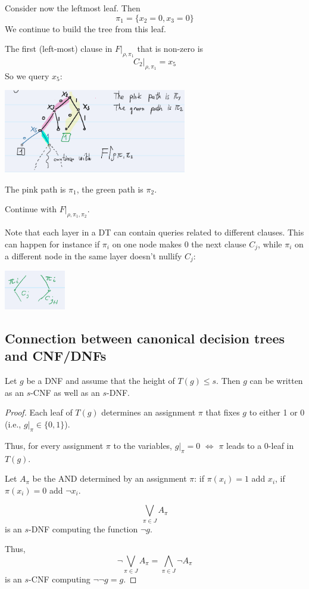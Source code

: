 Consider now the leftmost leaf. Then
\[
\pi_1 = \{ x_2 = 0, x_3 = 0 \}
\]
We continue to build the tree from this leaf.

\noindent
The first (left-most) clause in \( F|_{\rho, \pi_1} \) that is non-zero is
\[
C_2|_{\rho, \pi_1} = x_5
\]
So we query \( x_5 \):

\noindent
\includegraphics[width=0.6\textwidth]{images/ex4-sl-dt.png}
\noindent

The pink path is \( \pi_1 \), the green path is \( \pi_2 \).

\noindent
Continue with \( F|_{\rho, \pi_1, \pi_2} \).

\noindent
Note that each layer in a DT can contain queries related to different clauses.
This can happen for instance if \( \pi_i \) on one node makes 0 the next clause \( C_j \), 
while \( \pi_i \) on a different node in the same layer doesn't nullify \( C_j \):
 
\includegraphics[width=0.2\textwidth]{images/ex5-sl-dt.png}
 

\subsection{Connection between canonical decision trees and CNF/DNFs}
\begin{claim}
Let \( g \) be a DNF and assume that the height of \( T(g) \leq s \).
Then \( g \) can be written as an \( s \)-CNF as well as an \( s \)-DNF.
\end{claim}

\begin{proof}
Each leaf of \( T(g) \) determines an assignment \( \pi \) that fixes \( g \) to either 1 or 0 
(i.e., \( g|_{\pi} \in \{0,1\} \)).

Thus, for every assignment \( \pi \) to the variables, \( g|_{\pi} = 0 \) \( \Leftrightarrow \) 
\( \pi \) leads to a 0-leaf in \( T(g) \).

Let \( A_{\pi} \) be the AND determined by an assignment \( \pi \):
if \( \pi(x_i) = 1 \) add \( x_i \), if \( \pi(x_i) = 0 \) add \( \neg x_i \).

\[
\bigvee_{ \pi \in J } A_{\pi}
\]
is an \( s \)-DNF computing the function \( \neg g \).

Thus, 
\[
\neg \bigvee_{\pi \in J} A_{\pi} = \bigwedge_{\pi \in J} \neg A_{\pi}
\]
is an \( s \)-CNF computing \( \neg \neg g = g \).


\end{proof}

